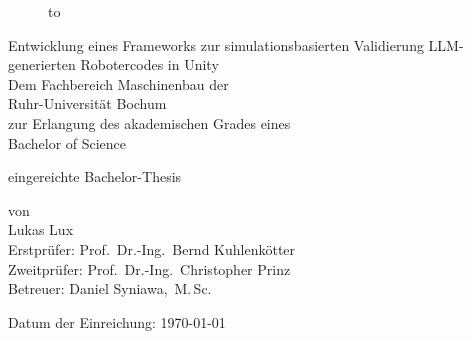 \begin{titlepage}
	\begin{center}
		\begin{figure}
			\vspace{-0.7cm}
			\begin{center}
				\hbox to 
			\end{center}
			\vspace{2.5cm}
		\end{figure}


		\Huge
		Entwicklung eines Frameworks zur simulationsbasierten Validierung LLM-generierten Robotercodes in Unity \\ %
		\vspace{1.5cm}
		\large
		Dem Fachbereich Maschinenbau der \\
		Ruhr-Universität Bochum \\
		zur Erlangung des akademischen Grades eines \\
		Bachelor of Science

		\vspace{1cm}
		eingereichte Bachelor-Thesis

		\vspace{1cm}
		von\\
		Lukas Lux \\

		\vspace{1.5cm}
		Erstprüfer: Prof.~Dr.-Ing.~Bernd Kuhlenkötter \\
		Zweitprüfer: Prof.~Dr.-Ing.~Christopher Prinz \\
		Betreuer: Daniel Syniawa,~M.\,Sc.

		\vspace{1cm}
		Datum der Einreichung: \today
	\end{center}
\end{titlepage}

